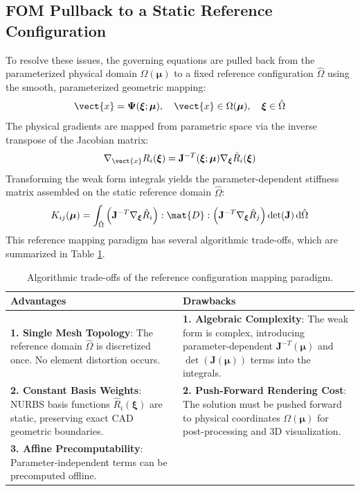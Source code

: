 \subsection{FOM Pullback to a Static Reference Configuration}
To resolve these issues, the governing equations are pulled back from the parameterized physical domain $\Omega(\boldsymbol{\mu})$ to a fixed reference configuration $\hat{\Omega}$ using the smooth, parameterized geometric mapping:
\begin{equation}
\vect{x} = \boldsymbol{\Psi}(\boldsymbol{\xi}; \boldsymbol{\mu}), \quad \vect{x} \in \Omega(\boldsymbol{\mu}), \quad \boldsymbol{\xi} \in \hat{\Omega}
\end{equation}
The physical gradients are mapped from parametric space via the inverse transpose of the Jacobian matrix:
\begin{equation}
\nabla_{\vect{x}} R_i(\boldsymbol{\xi}) = \mathbf{J}^{-T}(\boldsymbol{\xi}; \boldsymbol{\mu}) \nabla_{\boldsymbol{\xi}} \hat{R}_i(\boldsymbol{\xi})
\end{equation}
Transforming the weak form integrals yields the parameter-dependent stiffness matrix assembled on the static reference domain $\hat{\Omega}$:
\begin{equation}
K_{ij}(\boldsymbol{\mu}) = \int_{\hat{\Omega}} \left( \mathbf{J}^{-T} \nabla_{\boldsymbol{\xi}} \hat{R}_i \right) : \mat{D} : \left( \mathbf{J}^{-T} \nabla_{\boldsymbol{\xi}} \hat{R}_j \right) \det(\mathbf{J}) \, \mathrm{d}\hat{\Omega}
\end{equation}
This reference mapping paradigm has several algorithmic trade-offs, which are summarized in Table \ref{tab:mapping_tradeoffs}.

\begin{table}[htbp]
\centering
\caption{Algorithmic trade-offs of the reference configuration mapping paradigm.}
\label{tab:mapping_tradeoffs}
\begin{tabular}{p{7cm}p{7cm}}
\toprule
\textbf{Advantages} & \textbf{Drawbacks} \\ \midrule
\textbf{1. Single Mesh Topology}: The reference domain $\hat{\Omega}$ is discretized once. No element distortion occurs. & \textbf{1. Algebraic Complexity}: The weak form is complex, introducing parameter-dependent $\mathbf{J}^{-T}(\boldsymbol{\mu})$ and $\det(\mathbf{J}(\boldsymbol{\mu}))$ terms into the integrals. \\
\textbf{2. Constant Basis Weights}: NURBS basis functions $\hat{R}_i(\boldsymbol{\xi})$ are static, preserving exact CAD geometric boundaries. & \textbf{2. Push-Forward Rendering Cost}: The solution must be pushed forward to physical coordinates $\Omega(\boldsymbol{\mu})$ for post-processing and 3D visualization. \\
\textbf{3. Affine Precomputability}: Parameter-independent terms can be precomputed offline. & \\ \bottomrule
\end{tabular}
\end{table}

